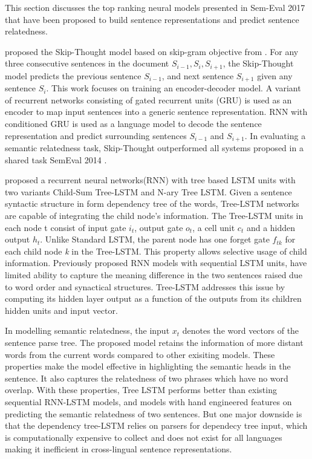 \documentclass[12pt]{report} %
\begin{document}
This section discusses the top ranking neural models presented in Sem-Eval 2017 that have been proposed to build sentence representations and predict sentence relatedness.

\cite{kiros2015skip} proposed the Skip-Thought model based on skip-gram objective from \cite{mikolov2014word2vec}. For any three consecutive sentences in the document $S_{i-1}, S_{i}, S_{i+1}$, the Skip-Thought model predicts the previous sentence $S_{i-1}$, and next sentence $S_{i+1}$ given any sentence $S_{i}$.
This work focuses on training an encoder-decoder model. A variant of recurrent networks consisting of gated recurrent units (GRU) \citep{cho2014learning} is used as an encoder to map input sentences into a generic sentence representation. RNN with conditioned GRU is used as a language model to decode the sentence representation and predict surrounding sentences $S_{i-1}$ and $S_{i+1}$. In evaluating a semantic relatedness task, Skip-Thought outperformed all systems proposed in a shared task SemEval 2014 \citep{marelli2014semeval}.

\cite{tai2015improved} proposed a recurrent neural networks(RNN) with tree based LSTM units with two variants Child-Sum Tree-LSTM and N-ary Tree LSTM. Given a sentence syntactic structure in form dependency tree of the words, Tree-LSTM networks are capable of integrating the child node's information. The Tree-LSTM units in each node t consist of input gate $i_{t}$, output gate $o_{t}$, a cell unit $c_{t}$ and a hidden output $h_{t}$. Unlike Standard LSTM, the parent node has one forget gate $f_{tk}$ for each child node \textit{k} in the Tree-LSTM. This property allows selective usage of child information. Previously proposed RNN models with sequential LSTM units, have limited ability to capture the meaning difference in the two sentences raised due to word order and synactical structures. Tree-LSTM addresses this issue by computing its hidden layer output as a function of the outputs from its children hidden units and input vector. 

In modelling semantic relatedness, the input $x_{t}$ denotes the word vectors of the sentence parse tree. The proposed model retains the information of more distant words from the current words compared to other exisiting models. These properties make the model effective in highlighting the semantic heads in the sentence. It also captures the relatedness of two phrases which have no word overlap. With these properties, Tree LSTM performs better than existing sequential RNN-LSTM models, and models with hand engineered features on predicting the semantic relatedness of two sentences. But one major downside is that the dependency tree-LSTM relies on parsers for dependecy tree input, which is computationally expensive to collect and does not exist for all languages making it inefficient in cross-lingual sentence representations.
\end{document}
